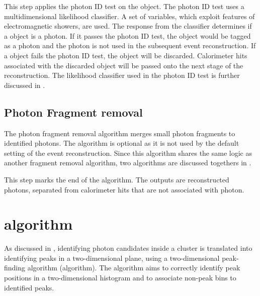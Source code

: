 This step applies the photon ID test on the \ShowerPeak object. The photon ID test uses  a multidimensional likelihood classifier. A set of variables, which exploit features of electromagnetic showers, are used. The response from the classifier determines if a \ShowerPeak object is a photon. If it passes the photon ID test, the \ShowerPeak object would be tagged as a photon and the photon is not used in the subsequent event reconstruction. If a \ShowerPeak object   fails the  photon ID test, the \ShowerPeak object  will be discarded. Calorimeter hits associated with the discarded  \ShowerPeak object will be passed onto the next stage of the reconstruction. The likelihood classifier used in the photon ID test is further discussed in .


\subsection{Photon Fragment removal}
\label{sec:photonRecoFragRemoval}

The  photon fragment removal algorithm merges small photon fragments to identified photons. The algorithm is optional as it is not used by the default setting of the event reconstruction. Since this algorithm shares the same logic as another fragment removal algorithm, two algorithms are discussed togethers in .


This step marks the end of the \PhotonReconstruction algorithm. The outputs are reconstructed photons, separated from calorimeter hits that are not associated with photon.

\section{\peakFinding algorithm}
\label{sec:peakFinding}

As discussed in , identifying photon candidates inside a cluster is translated into identifying peaks in a two-dimensional plane, using a two-dimensional peak-finding algorithm (\peakFinding algorithm). The \peakFinding algorithm aims to correctly identify peak positions in a two-dimensional histogram and to associate non-peak bins to identified peaks.


